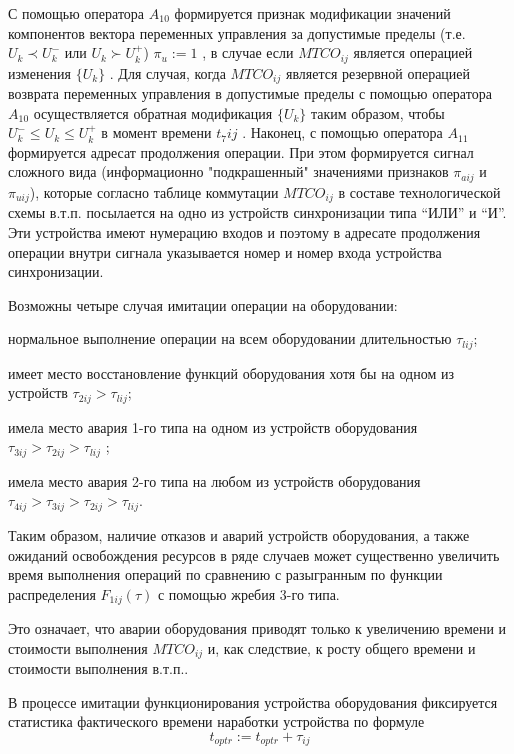 С помощью оператора $A_{10}$ формируется признак модификации значений компонентов вектора переменных управления за допустимые пределы (т.е. $U_k \prec U_k^-$ или $U_k \succ  U_k^+$)  $\pi_{u}:=1$ ,	 в случае если $MTCO_{ij}$ является операцией  изменения $\{U_k\}$ . Для случая, когда $MTCO_{ij}$ является резервной операцией возврата переменных управления в допустимые пределы с помощью оператора $A_{10}$ осуществляется обратная модификация $\{U_k\}$ таким образом, чтобы $U_k^-  \leq  U_k  \leq U_k^+$   в момент времени $t_7ij$ . Наконец, с помощью оператора $A_{11}$ формируется адресат продолжения операции. При этом формируется сигнал сложного вида (информационно "подкрашенный"{} значениями признаков $\pi_{aij}$ и $\pi_{uij}$), которые согласно таблице коммутации $MTCO_{ij}$ в составе технологической схемы в.т.п. посылается на одно из устройств синхронизации типа ``ИЛИ'' и ``И''.  Эти устройства имеют нумерацию входов и поэтому в  адресате продолжения операции внутри сигнала указывается номер и номер входа устройства синхронизации.

Возможны четыре случая имитации операции на оборудовании:
\begin{textitemize}
    \item нормальное выполнение операции на всем оборудовании длительностью $\tau_{lij}$;
    \item имеет место восстановление функций оборудования хотя бы на одном из устройств $\tau_{2ij}>\tau_{lij}$;
    \item имела место авария 1-го типа на одном из устройств оборудования $\tau_{3ij}>\tau_{2ij}>\tau_{lij}$ ;
    \item имела место авария 2-го типа на любом из устройств оборудования  $\tau_{4ij}>\tau_{3ij}>\tau_{2ij}>\tau_{lij}$.
\end{textitemize}

Таким образом, наличие отказов и аварий устройств оборудования, а также ожиданий освобождения ресурсов в ряде случаев может существенно увеличить время выполнения операций по сравнению с разыгранным по функции распределения $F_{1ij}(\tau)$ с помощью жребия 3-го типа.

Это означает, что аварии оборудования приводят только к увеличению времени и стоимости выполнения $MTCO_{ij}$ и, как следствие, к росту общего времени и стоимости выполнения в.т.п..



В процессе имитации функционирования устройства оборудования фиксируется статистика фактического времени наработки устройства по формуле
\begin{equation*}
		t_{optr}:=t_{optr}+\tau_{ij}
\end{equation*}

